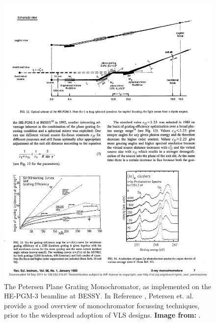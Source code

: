 \begin{figure}[htbp] %
   \centering
  \hspace*{-0.125in} \includegraphics[scale=1]{../data/Chapter1/1c_monoExample/1c_bessy_HE-PGM-3.pdf} 
   \caption[The Petersen Plane Grating Monochromator, as implemented on the HE-PGM-3 beamline at BESSY.]{The Petersen Plane Grating Monochromator, as implemented on the HE-PGM-3 beamline at BESSY.  In Reference \cite{Pet95}, Petersen et. al. provide a good overview of monochromator focussing techniques, prior to the widespread adoption of VLS designs.  \textbf{Image from:} \cite{Pet95}.}
   \label{1c}
\end{figure}

